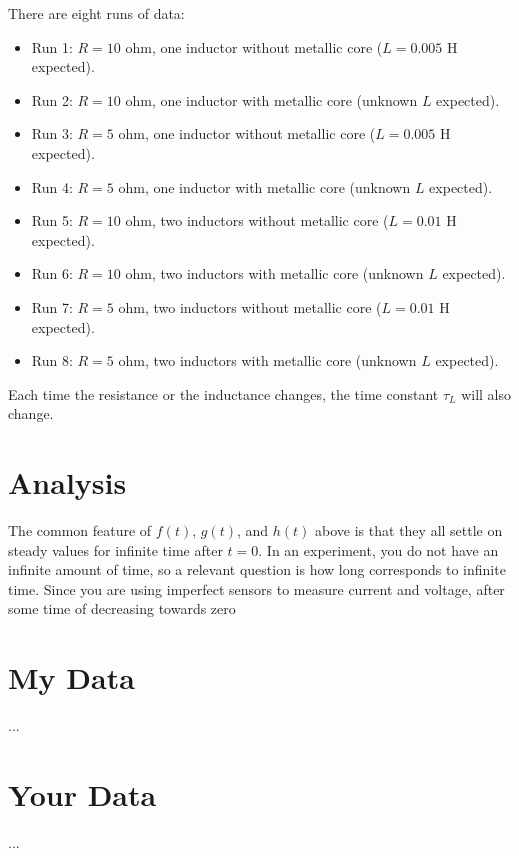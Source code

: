 There are eight runs of data:
\begin{itemize}
    \item Run 1: $R = 10$ ohm, one inductor without metallic core ($L = 0.005$ H expected).
    \item Run 2: $R = 10$ ohm, one inductor with metallic core (unknown $L$ expected).
    \item Run 3: $R = 5$ ohm, one inductor without metallic core ($L = 0.005$ H expected).
    \item Run 4: $R = 5$ ohm, one inductor with metallic core (unknown $L$ expected).
    \item Run 5: $R = 10$ ohm, two inductors without metallic core ($L = 0.01$ H expected).
    \item Run 6: $R = 10$ ohm, two inductors with metallic core (unknown $L$ expected).
    \item Run 7: $R = 5$ ohm, two inductors without metallic core ($L = 0.01$ H expected).
    \item Run 8: $R = 5$ ohm, two inductors with metallic core (unknown $L$ expected).
\end{itemize}
Each time the resistance or the inductance changes, the time constant $\tau_{L}$ will also change.
\section{Analysis}
The common feature of $f(t)$, $g(t)$, and $h(t)$ above is that they all settle on steady values for infinite time after $t = 0$. In an experiment, you do not have an infinite amount of time, so a relevant question is how long corresponds to infinite time. Since you are using imperfect sensors to measure current and voltage, after some time of decreasing towards zero 
\section{My Data}
...
\section{Your Data}
...
\newpage
